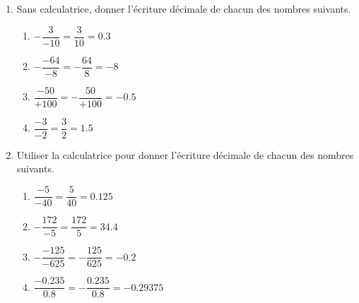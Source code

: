 \begin{corrige}
    \begin{spacing}{2}
    \begin{enumerate}
      \item Sans calculatrice, donner l'écriture décimale de chacun des nombres suivants.
      
          \begin{enumerate}
            \item $-\dfrac{3}{-10}    = \dfrac{3}{10}      = \num{0.3}$
            \item $-\dfrac{-64}{-8}   = -\dfrac{64}{8}   = -8$
            \item $ \dfrac{-50}{+100} =  -\dfrac{50}{+100} = -\num{0.5}$
            \item $ \dfrac{-3}{-2}    =  \dfrac{3}{2}    = \num{1.5}$
          \end{enumerate}        
      \setcounter{enumi}{1}
      \item Utiliser la calculatrice pour donner l'écriture décimale de chacun des nombres suivants.
          \begin{enumerate}
            \item $ \dfrac{-5}{-40}                 =  \dfrac{5}{40}                 = \num{0.125}$
            \item $-\dfrac{172}{-5}                 = \dfrac{172}{5}                 = \num{34.4}$
            \item $-\dfrac{-125}{-625}              = -\dfrac{125}{625}              = -\num{0.2}$
            \item $ \dfrac{-\num{0.235}}{\num{0.8}} =  -\dfrac{\num{0.235}}{\num{0.8}} = -\num{0.29375}$
          \end{enumerate}
    \end{enumerate}   
  \end{spacing}     
  \end{corrige}

